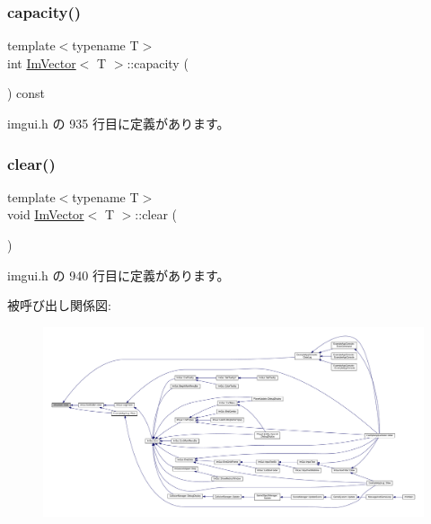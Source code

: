 \subsubsection{\texorpdfstring{capacity()}{capacity()}}
{\footnotesize\ttfamily template$<$typename T$>$ \\
int \mbox{\hyperlink{class_im_vector}{Im\+Vector}}$<$ T $>$\+::capacity (\begin{DoxyParamCaption}{ }\end{DoxyParamCaption}) const\hspace{0.3cm}{\ttfamily [inline]}}



 imgui.\+h の 935 行目に定義があります。

\mbox{\label{class_im_vector_ae2d401b4ec5f1113cdb8edb5a61a38f7}} 
\subsubsection{\texorpdfstring{clear()}{clear()}}
{\footnotesize\ttfamily template$<$typename T$>$ \\
void \mbox{\hyperlink{class_im_vector}{Im\+Vector}}$<$ T $>$\+::clear (\begin{DoxyParamCaption}{ }\end{DoxyParamCaption})\hspace{0.3cm}{\ttfamily [inline]}}



 imgui.\+h の 940 行目に定義があります。

被呼び出し関係図\+:
\nopagebreak
\begin{figure}[H]
\begin{center}
\leavevmode
\includegraphics[width=350pt]{class_im_vector_ae2d401b4ec5f1113cdb8edb5a61a38f7_icgraph}
\end{center}
\end{figure}
\mbox{\label{class_im_vector_aa53e48a5272f4bad1099368769514ff1}} 
